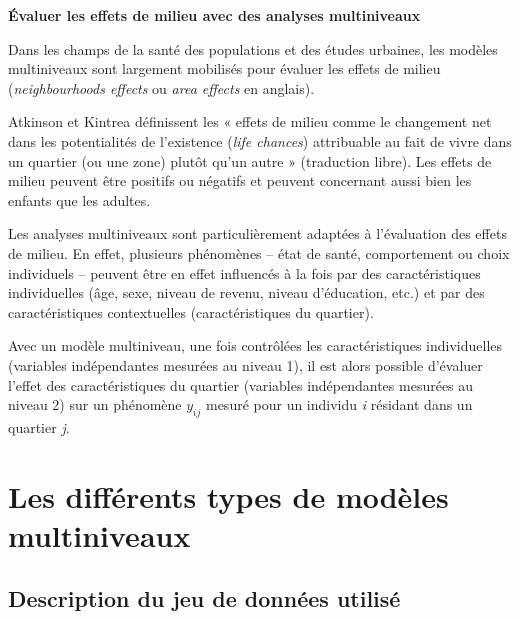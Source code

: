 \documentclass[
  11pt,
  french,
]{book}
\makeatletter
\newenvironment{kframev}{%
\medskip{}
\setlength{\fboxsep}{.8em}
 \def\at@end@of@kframev{}%
 \ifinner\ifhmode%
  \def\at@end@of@kframev{\end{minipage}}%
  \begin{minipage}{\columnwidth}%
 \fi\fi%
 \def\FrameCommand##1{\hskip\@totalleftmargin \hskip-\fboxsep
 \colorbox{shadebluecolor}{##1}\hskip-\fboxsep
     \hskip-\linewidth \hskip-\@totalleftmargin \hskip\columnwidth}%
 \MakeFramed {\advance\hsize-\width
   \@totalleftmargin\z@ \linewidth\hsize
   \@setminipage}}%
 {\par\unskip\endMakeFramed%
 \at@end@of@kframev}
\newenvironment{rmdblock}[1]
  {
  \begin{itemize}
  \renewcommand{\labelitemi}{
    \raisebox{-.7\height}[0pt][0pt]{
      {\setkeys{Gin}{width=3em,keepaspectratio}\texttt{[image: images/\#1]}}
    }
  }
  \setlength{\fboxsep}{1em}
  \begin{kframev}
  \small
  \item
  }
  {
  \end{kframev}
  \end{itemize}
  }
\newenvironment{bloc_aller_loin}
  {\begin{rmdblock}{aller_loin}}
  {\end{rmdblock}}
\makeatother
\begin{document}
\begin{bloc_aller_loin}

\textbf{Évaluer les effets de milieu avec des analyses multiniveaux}

Dans les champs de la santé des populations et des études urbaines, les modèles multiniveaux sont largement mobilisés pour évaluer les effets de milieu (\emph{neighbourhoods effects} ou \emph{area effects} en anglais).

Atkinson et Kintrea \citeyearpar[p.~2278]{atkinson2001disentangling} définissent les « effets de milieu comme le changement net dans les potentialités de l'existence (\emph{life chances}) attribuable au fait de vivre dans un quartier (ou une zone) plutôt qu'un autre » (traduction libre). Les effets de milieu peuvent être positifs ou négatifs et peuvent concernant aussi bien les enfants que les adultes.

Les analyses multiniveaux sont particulièrement adaptées à l'évaluation des effets de milieu. En effet, plusieurs phénomènes -- état de santé, comportement ou choix individuels -- peuvent être en effet influencés à la fois par des caractéristiques individuelles (âge, sexe, niveau de revenu, niveau d'éducation, etc.) et par des caractéristiques contextuelles (caractéristiques du quartier).

Avec un modèle multiniveau, une fois contrôlées les caractéristiques individuelles (variables indépendantes mesurées au niveau 1), il est alors possible d'évaluer l'effet des caractéristiques du quartier (variables indépendantes mesurées au niveau 2) sur un phénomène \(y_{ij}\) mesuré pour un individu \emph{i} résidant dans un quartier \emph{j}.

\end{bloc_aller_loin}

\hypertarget{sect082}{%
\section{Les différents types de modèles multiniveaux}\label{sect082}}

\hypertarget{sect0821}{%
\subsection{Description du jeu de données utilisé}\label{sect0821}}
\end{document}
